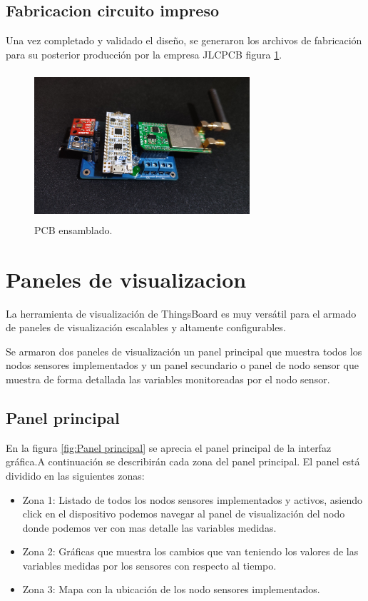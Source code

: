 \subsection{Fabricacion circuito impreso} 
Una vez completado y validado el diseño, se generaron los archivos de fabricación para su posterior producción por la empresa JLCPCB figura \ref{fig:PCB ensamblado}. 
\begin{figure}[h!]
  \centering
	\includegraphics[width=8cm, height=5.5cm]{./Figures/hardware_vistalateral.jpg}
  \caption{PCB ensamblado.}
	\label{fig:PCB ensamblado}
\end{figure}

\clearpage
\section{Paneles de visualizacion}
La herramienta de visualización de ThingsBoard es muy versátil para el armado de paneles de visualización escalables y altamente configurables.

Se armaron dos paneles de visualización un panel principal que muestra todos los nodos sensores implementados y un panel secundario o panel de nodo sensor que muestra de forma detallada las variables monitoreadas por el nodo sensor.

\subsection{Panel principal} 

En la figura \ref{fig:Panel principal} se aprecia el panel principal de la interfaz gráfica.A continuación se describirán cada zona del panel principal.
El panel está dividido en las siguientes zonas:
\begin{itemize}
  \item Zona 1: Listado de todos los nodos sensores implementados y activos, asiendo click en el dispositivo podemos navegar al panel de visualización del nodo donde podemos ver con mas detalle las variables medidas.
  \item Zona 2: Gráficas que muestra los cambios que van teniendo los valores de las variables medidas por los sensores con respecto al tiempo.
  \item Zona 3: Mapa con la ubicación de los nodo sensores implementados.
\end{itemize}

